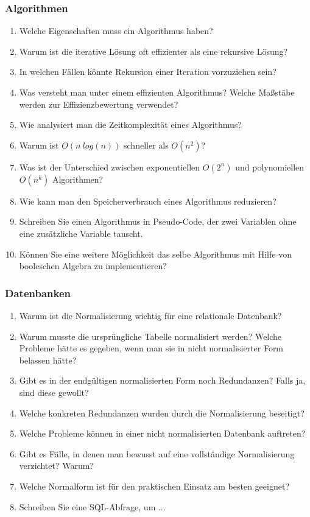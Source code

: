 \documentclass[a4paper,12pt]{article}
\begin{document}
	\subsubsection*{Algorithmen}
	\begin{enumerate}
		\item Welche Eigenschaften muss ein Algorithmus haben?
		\item Warum ist die iterative Lösung oft effizienter als eine rekursive Lösung?
		\item In welchen Fällen könnte Rekursion einer Iteration vorzuziehen sein?
		\item Was versteht man unter einem effizienten Algorithmus? Welche Maßstäbe werden zur Effizienzbewertung verwendet?
		\item Wie analysiert man die Zeitkomplexität eines Algorithmus?
		\item Warum ist $O(n \ log(n))$ schneller als $O(n^2)$?
		\item Was ist der Unterschied zwischen exponentiellen $O(2^n)$ und polynomiellen $O(n^k)$ Algorithmen?
		\item Wie kann man den Speicherverbrauch eines Algorithmus reduzieren?
		\item Schreiben Sie einen Algorithmus in Pseudo-Code, der zwei Variablen ohne eine zusätzliche Variable tauscht.
		\item Können Sie eine weitere Möglichkeit das selbe Algorithmus mit Hilfe von booleschen Algebra zu implementieren?	
		
		
	\end{enumerate}
	\subsubsection*{Datenbanken}
	\begin{enumerate}
		\item Warum ist die Normalisierung wichtig für eine relationale Datenbank?
		\item Warum musste die ursprüngliche Tabelle normalisiert werden? Welche Probleme hätte es gegeben, wenn man sie in nicht normalisierter Form belassen hätte?
		\item Gibt es in der endgültigen normalisierten Form noch Redundanzen? Falls ja, sind diese gewollt?
		\item Welche konkreten Redundanzen wurden durch die Normalisierung beseitigt?
		\item Welche Probleme können in einer nicht normalisierten Datenbank auftreten?
		\item Gibt es Fälle, in denen man bewusst auf eine vollständige Normalisierung verzichtet? Warum?
		\item Welche Normalform ist für den praktischen Einsatz am besten geeignet?
		\item Schreiben Sie eine SQL-Abfrage, um ...
	\end{enumerate}
	
\end{document}
